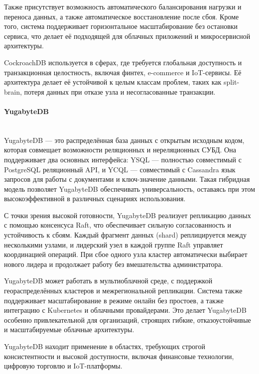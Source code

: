 Также присутствует возможность автоматического балансирования нагрузки и переноса данных, а также автоматическое восстановление после сбоя. Кроме того, система поддерживает горизонтальное масштабирование без остановки сервиса, что делает её подходящей для облачных приложений и микросервисной архитектуры.

CockroachDB используется в сферах, где требуется глобальная доступность и транзакционная целостность, включая финтех, e-commerce и IoT-сервисы. Её архитектура делает её устойчивой к целым классам проблем, таких как split-brain, потеря данных при отказе узла и несогласованные транзакции.

\paragraph{YugabyteDB} ~\\

YugabyteDB — это распределённая база данных с открытым исходным кодом, которая совмещает возможности реляционных и нереляционных СУБД. Она поддерживает два основных интерфейса: YSQL — полностью совместимый с PostgreSQL реляционный API, и YCQL — совместимый с Cassandra язык запросов для работы с документами и ключ-значение данными. Такая гибридная модель позволяет YugabyteDB обеспечивать универсальность, оставаясь при этом высокоэффективной в различных сценариях использования.

С точки зрения высокой готовности, YugabyteDB реализует репликацию данных с помощью консенсуса Raft, что обеспечивает сильную согласованность и устойчивость к сбоям. Каждый фрагмент данных (shard) реплицируется между несколькими узлами, и лидерский узел в каждой группе Raft управляет координацией операций. При сбое одного узла кластер автоматически выбирает нового лидера и продолжает работу без вмешательства администратора. \autocite{Choudhury}

YugabyteDB может работать в мультиоблачной среде, с поддержкой геораспределённых кластеров и межрегиональной репликации. Система также поддерживает масштабирование в режиме онлайн без простоев, а также интеграцию с Kubernetes и облачными провайдерами. Это делает YugabyteDB особенно привлекательной для организаций, строящих гибкие, отказоустойчивые и масштабируемые облачные архитектуры.

YugabyteDB находит применение в областях, требующих строгой консистентности и высокой доступности, включая финансовые технологии, цифровую торговлю и IoT-платформы.

